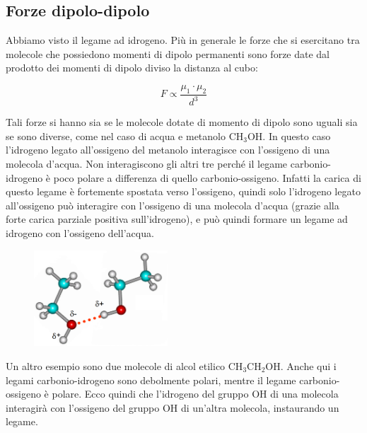 \subsection{Forze dipolo-dipolo}
Abbiamo visto il legame ad idrogeno. Più in generale le forze che si esercitano tra molecole che possiedono momenti di dipolo permanenti sono forze date dal prodotto dei momenti di dipolo diviso la distanza al cubo:

$$F \propto \frac{\mu_1 \cdot \mu_2}{d^3}$$

Tali forze si hanno sia se le molecole dotate di momento di dipolo sono uguali sia se sono diverse, come nel caso di acqua e metanolo CH$_3$OH. In questo caso l'idrogeno legato all'ossigeno del metanolo interagisce con l'ossigeno di una molecola d'acqua. Non interagiscono gli altri tre perché il legame carbonio-idrogeno è poco polare a differenza di quello carbonio-ossigeno. Infatti la carica di questo legame è fortemente spostata verso l'ossigeno, quindi solo l'idrogeno legato all'ossigeno può interagire con l'ossigeno di una molecola d'acqua (grazie alla forte carica parziale positiva sull'idrogeno), e può quindi formare un legame ad idrogeno con l'ossigeno dell'acqua.

\hspace{0.5cm}\begin{minipage}{0.35 \textwidth}
    \begin{figure}[H]
        \includegraphics[width=5cm]{immagini/alcol_etilico.png}
    \end{figure}
\end{minipage}
\begin{minipage}{0.6 \textwidth}
    \vspace{0.6cm}Un altro esempio sono due molecole di alcol etilico CH$_3$CH$_2$OH. Anche qui i legami carbonio-idrogeno sono debolmente polari, mentre il legame carbonio-ossigeno è polare. Ecco quindi che l'idrogeno del gruppo OH di una molecola interagirà con l'ossigeno del gruppo OH di un'altra molecola, instaurando un legame.
\end{minipage}

